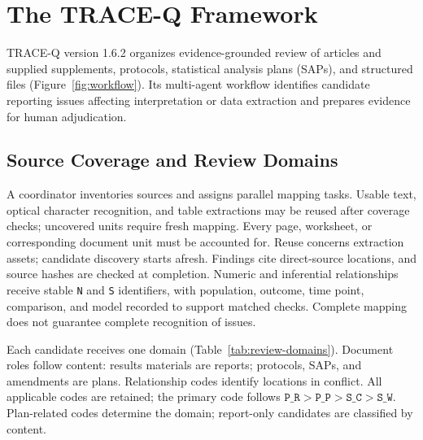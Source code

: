 \section{The TRACE-Q Framework}
\label{sec:framework}

TRACE-Q version 1.6.2 organizes evidence-grounded review of articles and supplied supplements, protocols, statistical analysis plans (SAPs), and structured files (Figure~\ref{fig:workflow}). Its multi-agent workflow identifies candidate reporting issues affecting interpretation or data extraction and prepares evidence for human adjudication.

\subsection{Source Coverage and Review Domains}
\label{sec:framework-evidence}
\label{sec:framework-domains}

A coordinator inventories sources and assigns parallel mapping tasks. Usable text, optical character recognition, and table extractions may be reused after coverage checks; uncovered units require fresh mapping. Every page, worksheet, or corresponding document unit must be accounted for. Reuse concerns extraction assets; candidate discovery starts afresh. Findings cite direct-source locations, and source hashes are checked at completion. Numeric and inferential relationships receive stable \texttt{N} and \texttt{S} identifiers, with population, outcome, time point, comparison, and model recorded to support matched checks. Complete mapping does not guarantee complete recognition of issues.

Each candidate receives one domain (Table~\ref{tab:review-domains}). Document roles follow content: results materials are reports; protocols, SAPs, and amendments are plans. Relationship codes identify locations in conflict. All applicable codes are retained; the primary code follows \(\texttt{P\_R}>\texttt{P\_P}>\texttt{S\_C}>\texttt{S\_W}\). Plan-related codes determine the domain; report-only candidates are classified by content.


